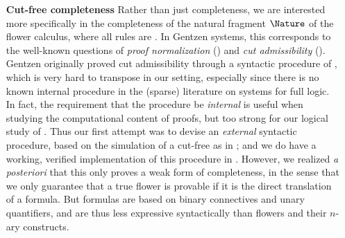 \begin{scope}
\begin{itemize}
  \item[\textbf{Cut-free completeness}]
    Rather than just completeness, we are interested more specifically in the
    completeness of the natural fragment $\Nature$ of the flower calculus, where
    all rules are \emph{}. In Gentzen systems, this corresponds to
    the well-known questions of \emph{proof normalization} () and \emph{cut admissibility} (). Gentzen
    originally proved cut admissibility through a syntactic procedure of
    \emph{}, which is very hard to transpose in our  setting, especially since there is no known internal
     procedure in the (sparse) literature on  systems for full  logic. In fact, the
    requirement that the procedure be \emph{internal} is useful when studying
    the computational content of proofs, but too strong for our logical study of
    . Thus our first attempt was to devise an \emph{external}
    syntactic procedure, based on the simulation of a cut-free  as in ; and we do have a working,
    verified implementation of this procedure in 
    \cite{flowers-metatheory}. However, we realized \textit{a posteriori} that
    this only proves a weak form of completeness, in the sense that we only
    guarantee that a true flower is provable if it is the direct translation of
    a  formula. But formulas are based on binary connectives and
    unary quantifiers, and are thus less expressive syntactically than flowers
    and their $n$-ary constructs.


\end{itemize}
\end{scope}
